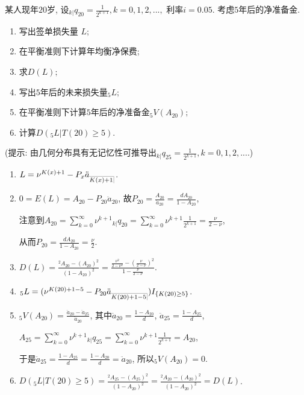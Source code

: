 \documentclass[lang=cn,10pt]{elegantbook}
\makeatletter
\DeclareRobustCommand{\annu}[1]{_{%
    \def\arraystretch{0}%
    \setlength\arraycolsep{1pt}%
    \setlength\arrayrulewidth{.2pt}%
    \begin{array}[b]{@{}c|}\hline
        \\[\arraycolsep]%
        \scriptstyle #1%
    \end{array}%
}}
\makeatother
\begin{document}
\begin{example}\label{l5.2}某人现年$20$岁, 设${}_{k|}q_{20}=\frac{1}{2^{k+1}},k=0,1,2,...,$ 利率$i=0.05.$ 考虑$5$年后的净准备金. 
    \begin{enumerate}[(1)]
        \item 写出签单损失量 $L;$
        \item 在平衡准则下计算年均衡净保费;
        \item 求$D(L);$
        \item 写出$5$年后的未来损失量$_{5}L;$
        \item 在平衡准则下计算$5$年后的净准备金${}_{5}V( A_{20});$
        \item 计算$D({}_{5}L|T(20)\geq 5).$
    \end{enumerate}
    (提示: 由几何分布具有无记忆性可推导出${}_{k|}q_{25}=\frac{1}{2^{k+1}},k=0,1,2,....$)
\end{example}
\begin{solution}
    \begin{enumerate}[(1)]
        \item $L = \nu^{K(x)+1} - P_x\ddot{a}_{\annu{K(x)+1}}$.
        \item $0=E(L)=A_{20}-P_{20}\ddot{a}_{20}$, 故$P_{20}=\frac{A_{20}}{\ddot{a}_{20}} = \frac{dA_{20}}{1-A_{20}}$,

注意到$A_{20}=\sum_{k=0}^{\infty}\nu^{k+1}{}_{k|}q_{20} = \sum_{k=0}^{\infty}\nu^{k+1}\frac{1}{2^{k+1}} = \frac{\nu}{2-\nu}$,

从而$P_{20}=\frac{dA_{20}}{1-A_{20}}=\frac{\nu}{2}.$
        \item $D(L)=\frac{^2A_{20}-(A_{20})^2}{(1-A_{20})^2}=\frac{\frac{\nu^{2}}{2-\nu^{2}}-\left(\frac{\nu}{2-\nu}\right)^{2}}{1-\frac{\nu}{2-\nu}}$.
        \item ${}_{5}L= (\nu^{K(20)+1-5}-P_{20}\ddot{a}_{\annu{K(20)+1-5}} )I_{\{K(20)\geq 5\}}$.
        \item ${}_{5}V(A_{20})=\frac{\ddot{a}_{20}-\ddot{a}_{25}}{\ddot{a}_{20}}$, 其中$\ddot{a}_{20}=\frac{1-A_{20}}{d}$, $\ddot{a}_{25}=\frac{1-A_{25}}{d}$,

$A_{25}=\sum_{k=0}^{\infty}\nu^{k+1}{}_{k|}q_{25} = \sum_{k=0}^{\infty}\nu^{k+1}\frac{1}{2^{k+1}} = A_{20}$,

于是$\ddot{a}_{25}=\frac{1-A_{25}}{d} = \frac{1-A_{20}}{d} = \ddot{a}_{20}$, 所以${}_{5}V(A_{20})=0$.
        \item $D({}_{5}L|T(20)\geq 5)=\frac{^2A_{25}-(A_{25})^2}{(1-A_{20})^2} = \frac{^2A_{20}-(A_{20})^2}{(1-A_{20})^2} = D(L)$.
    \end{enumerate}
\end{solution}
\end{document}
